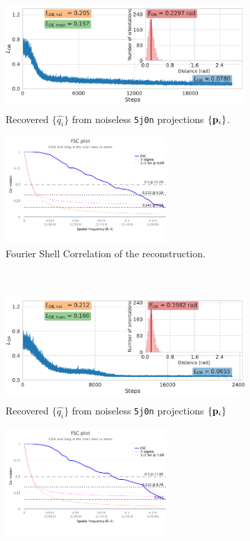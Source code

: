 \begin{figure}[ht!]
    \centering
    \begin{subfigure}[b]{0.55\linewidth}
        \centering
        \includegraphics[height=11em]{figures/5j0n_ar_aa_fullcvg.pdf}
        \caption{Recovered $\{ \widehat{q_i} \}$ from noiseless \texttt{5j0n} projections $\{ \mathbf{p}_i \}$.}
    \end{subfigure}
    \hfill
    \begin{subfigure}[b]{0.4\linewidth}
        \centering
        \includegraphics[height=11em]{figures/FSC_5j0n_fullcvg_noise0_fin_vs_init.pdf}
        \caption{Fourier Shell Correlation of the reconstruction.}
    \end{subfigure}
    \\ \vspace{1em}
    \begin{subfigure}[b]{0.55\linewidth}
        \centering
        \includegraphics[height=11em]{figures/5j0n_ar_aa_fullcvg_uniform2.pdf}
        \caption{Recovered $\{ \widehat{q_i} \}$ from noiseless \texttt{5j0n} projections $\{ \mathbf{p}_i \}$}
    \end{subfigure}
    \hfill
    \begin{subfigure}[b]{0.4\linewidth}
        \centering
        \includegraphics[height=11em]{figures/FSC_5j0n_gt_5j0n_apr_fullcvg_uniform2.pdf}

\end{subfigure}
\end{figure}
